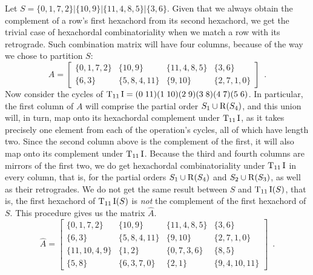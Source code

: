 \begin{example}
    \cite[224]{Starr1984}
    Let $S = \{ 0, 1, 7, 2 \} | \{ 10, 9 \} | \{ 11, 4, 8, 5 \} | \{ 3, 6 \}$. Given that we always obtain the complement of a row's first hexachord from its second hexachord, we get the trivial case of hexachordal combinatoriality when we match a row with its retrograde. Such combination matrix will have four columns, because of the way we chose to partition $S$:
    \begin{equation}
        A = \left[
        \begin{array}{c|c|c|c}
        	\{ 0, 1, 7, 2 \} & \{ 10, 9 \} & \{ 11, 4, 8, 5 \} & \{ 3, 6 \} \\
        	\{ 6, 3 \} & \{ 5, 8, 4, 11 \} & \{ 9, 10 \} & \{ 2, 7, 1, 0 \}
        \end{array}
        \right] \enspace.
    \end{equation}
    Now consider the cycles of $\operatorname{T}_{11}\operatorname{I} = (0 \; 11) (1 \; 10) (2 \; 9) (3 \; 8) (4 \; 7) (5 \; 6)$. In particular, the first column of $A$ will comprise the partial order $S_1 \cup \operatorname{R}(S_4)$, and this union will, in turn, map onto its hexachordal complement under $\operatorname{T}_{11}\operatorname{I}$, as it takes precisely one element from each of the operation's cycles, all of which have length two. Since the second column above is the complement of the first, it will also map onto its complement under $\operatorname{T}_{11}\operatorname{I}$. Because the third and fourth columns are mirrors of the first two, we do get hexachordal combinatoriality under $\operatorname{T}_{11}\operatorname{I}$ in every column, that is, for the partial orders $S_1 \cup \operatorname{R}(S_4)$ and $S_2 \cup \operatorname{R}(S_3)$, as well as their retrogrades. We do not get the same result between $S$ and $\operatorname{T}_{11}\operatorname{I}(S)$, that is, the first hexachord of $\operatorname{T}_{11}\operatorname{I}(S)$ is \emph{not} the complement of the first hexachord of $S$. This procedure gives us the matrix $\hat{A}$.
    \begin{equation}
        \hat{A} = \left[
        \begin{array}{c|c|c|c}
        	\{ 0, 1, 7, 2 \} & \{ 10, 9 \} & \{ 11, 4, 8, 5 \} & \{ 3, 6 \} \\
        	\{ 6, 3 \} & \{ 5, 8, 4, 11 \} & \{ 9, 10 \} & \{ 2, 7, 1, 0 \} \\
        	\{ 11, 10, 4, 9 \} & \{ 1, 2 \} & \{ 0, 7, 3, 6 \} & \{ 8, 5 \} \\
        	\{ 5, 8 \} & \{ 6, 3, 7, 0 \} & \{ 2, 1 \} & \{ 9, 4, 10, 11 \}
        \end{array}
        \right] \enspace.
    \end{equation}

\end{example}
